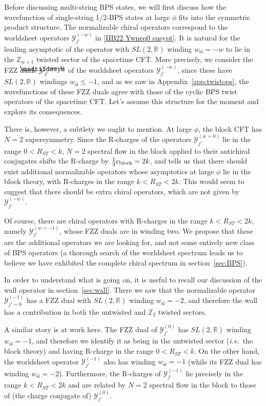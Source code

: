 \documentclass[12pt]{article}
\def\sl{\text{sl}}
\def\sltwo{\ensuremath{SL(2,\bR)}}
\def\ie{{i.e.}}
\newcommand\lowermedtildesym{%
  \text{\smash{\raisebox{-1.2ex}{%
    $\medtildesym$}}}}
\newcommand\medtilde[1]{%
  \mathchoice
    {\accentset{\displaystyle\lowermedtildesym}{#1}}
    {\accentset{\textstyle\lowermedtildesym}{#1}}
    {\accentset{\scriptstyle\lowermedtildesym}{#1}}
    {\accentset{\scriptscriptstyle\lowermedtildesym}{#1}}
}
\newcommand{\bR}{{\mathbb R}}
\numberwithin{equation}{section}
\def\cY{\mathcal {Y}} \def\cZ{\mathcal {Z}}
\def\ie{{\it i.e.}}
\def\ie{{\it i.e.}}
\begin{document}
\begin{appendices}
Before discussing multi-string BPS states, we will first discuss how the wavefunction of single-string 1/2-BPS states at large $\phi$ fits into the symmetric product structure. The normalizable chiral operators correspond to the worldsheet operators $\cY_{j'}^{(-w)}$ in \eqref{IIB22 Ywneq0 susypt}. It is natural for the leading asymptotic of the operator with $\sltwo$ winding $w_{\sl}=-w$ to lie in the $\mathbb{Z}_{w+1}$ twisted sector of the spacetime CFT. More precisely, we consider the FZZ duals $\medtilde\cY_{j'}^{(-w-1)}$ of the worldsheet operators $\cY_{j'}^{(-w)}$, since these have $\sltwo$ windings $w_{\sl}\leq -1$, and as we saw in Appendix~\ref{app:twistops}, the wavefunctions of these FZZ duals agree with those of the cyclic BPS twist operators of the spacetime CFT. Let's assume this structure for the moment and explore its consequences.

There is, however, a subtlety we ought to mention.  At large $\phi$, the block CFT has $N=2$ supersymmetry. Since the R-charges of the operators $\cY_{j'}^{(w=0)}$ lie in the range $0<R_{ST}<k$, $N=2$ spectral flow in the block applied to their antichiral conjugates shifts the R-charge by $\frac13 c_{\rm block}=2k$, and tells us that there should exist additional normalizable operators whose asymptotics at large $\phi$ lie in the block theory, with R-charges in the range $k<R_{ST}<2k$. This would seem to suggest that there should be extra chiral operators, which are not given by $\cY_{j'}^{(-w)}$.

Of course, there are chiral operators with R-charges in the range $k<R_{ST}<2k$, namely $\cY_{j'}^{(w=-1)}$, whose FZZ duals are in winding two.  We propose that these are the additional operators we are looking for, and not some entirely new class of BPS operators (a thorough search of the worldsheet spectrum leads us to believe we have exhibited the complete chiral spectrum in section~\ref{sec:BPS}).  

In order to understand what is going on, it is useful to recall our discussion of the wall operator in section~\ref{sec:wall}. There we saw that the normalizable operator $\cY_{j'=0}^{(-1)}$ has a FZZ dual with $\sltwo$ winding $w_{\sl}=-2$, and therefore the wall has a contribution in both the untwisted and $\mathbb{Z}_2$ twisted sectors. 

A similar story is at work here. The FZZ dual of $\cY_{j'}^{(0)}$ has $\sltwo$ winding $w_{\sl}=-1$, and therefore we identify it as being in the untwisted sector (\ie\ the block theory) and having R-charge in the range $0<R_{ST}<k$. On the other hand, the worldsheet operator $\cY_{j'}^{(-1)}$ also has winding $w_\sl=-1$ (while its FZZ dual has winding $w_\sl=-2$).  Furthermore, the R-charges of $\cY_{j'}^{(-1)}$ lie precisely in the range $k<R_{ST}<2k$ and are related by $N=2$ spectral flow in the block to those of (the charge conjugate of) $\cY_{j'}^{(0)}$.


\end{appendices}
\end{document}
